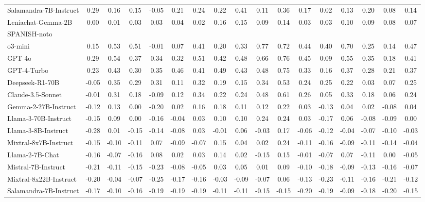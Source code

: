 \begin{table*}[ht]
{\begin{tabular}{lcccccccccccccccc}
Salamandra-7B-Instruct & 0.29 & 0.16 & 0.15 & -0.05 & 0.21 & 0.24 & 0.22 & 0.41 & 0.11 & 0.36 & 0.17 & 0.02 & 0.13 & 0.20 & 0.08 & 0.14 \\
Leniachat-Gemma-2B & 0.00 & 0.01 & 0.03 & 0.03 & 0.04 & 0.02 & 0.16 & 0.15 & 0.09 & 0.14 & 0.03 & 0.03 & 0.10 & 0.09 & 0.08 & 0.07 \\
\midrule
SPANISH-noto &&&&&&&&&&&&\\
\midrule
o3-mini & 0.15 & 0.53 & 0.51 & -0.01 & 0.07 & 0.41 & 0.20 & 0.33 & 0.77 & 0.72 & 0.44 & 0.40 & 0.70 & 0.25 & 0.14 & 0.47 \\
GPT-4o & 0.29 & 0.54 & 0.37 & 0.34 & 0.32 & 0.51 & 0.42 & 0.48 & 0.66 & 0.76 & 0.45 & 0.09 & 0.55 & 0.35 & 0.18 & 0.41 \\
GPT-4-Turbo & 0.23 & 0.43 & 0.30 & 0.35 & 0.46 & 0.41 & 0.49 & 0.43 & 0.48 & 0.75 & 0.33 & 0.16 & 0.37 & 0.28 & 0.21 & 0.37 \\
Deepseek-R1-70B & -0.05 & 0.35 & 0.29 & 0.31 & 0.11 & 0.32 & 0.19 & 0.15 & 0.34 & 0.53 & 0.24 & 0.25 & 0.22 & 0.03 & 0.07 & 0.25 \\
Claude-3.5-Sonnet & -0.01 & 0.31 & 0.18 & -0.09 & 0.12 & 0.34 & 0.22 & 0.24 & 0.48 & 0.61 & 0.26 & 0.05 & 0.33 & 0.18 & 0.06 & 0.24 \\
Gemma-2-27B-Instruct & -0.12 & 0.13 & 0.00 & -0.20 & 0.02 & 0.16 & 0.18 & 0.11 & 0.12 & 0.22 & 0.03 & -0.13 & 0.04 & 0.02 & -0.08 & 0.04 \\
Llama-3-70B-Instruct & -0.15 & 0.09 & 0.00 & -0.16 & -0.04 & 0.03 & 0.10 & 0.10 & 0.24 & 0.24 & 0.03 & -0.17 & 0.06 & -0.08 & -0.09 & 0.00 \\
Llama-3-8B-Instruct & -0.28 & 0.01 & -0.15 & -0.14 & -0.08 & 0.03 & -0.01 & 0.06 & -0.03 & 0.17 & -0.06 & -0.12 & -0.04 & -0.07 & -0.10 & -0.03 \\
Mixtral-8x7B-Instruct & -0.15 & -0.10 & -0.11 & 0.07 & -0.09 & -0.07 & 0.15 & 0.04 & 0.02 & 0.24 & -0.11 & -0.16 & -0.09 & -0.11 & -0.14 & -0.04 \\
Llama-2-7B-Chat & -0.16 & -0.07 & -0.16 & 0.08 & 0.02 & 0.03 & 0.14 & 0.02 & -0.15 & 0.15 & -0.01 & -0.07 & 0.07 & -0.11 & 0.00 & -0.05 \\
Mistral-7B-Instruct & -0.21 & -0.11 & -0.15 & -0.23 & -0.08 & -0.05 & 0.03 & 0.05 & 0.01 & 0.09 & -0.10 & -0.18 & -0.09 & -0.13 & -0.16 & -0.07 \\
Mixtral-8x22B-Instruct & -0.20 & -0.04 & -0.07 & -0.25 & -0.17 & -0.16 & -0.03 & -0.09 & -0.07 & 0.06 & -0.13 & -0.23 & -0.11 & -0.16 & -0.21 & -0.12 \\
Salamandra-7B-Instruct & -0.17 & -0.10 & -0.16 & -0.19 & -0.19 & -0.19 & -0.11 & -0.11 & -0.15 & -0.15 & -0.20 & -0.19 & -0.09 & -0.18 & -0.20 & -0.15 \\

\end{tabular}}
\end{table*}
